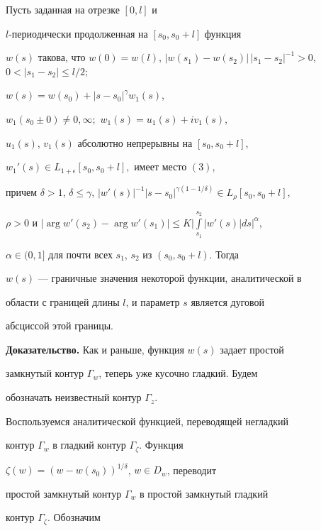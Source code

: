 \begin{thmnonum}


Пусть заданная на отрезке $[0,l]$ и


$l$-периодически продолженная на $[s_0,s_0 + l]$ функция


$w(s)$ такова, что $w(0) = w(l)$, $|w(s_1)-


w(s_2)|\,|s_1 - s_2|^{-1} > 0$, $0 < |s_1 - s_2| \leq l/2;$


$w(s) = w(s_0) + |s-s_0|^{\gamma}w_1(s)$,


$w_1(s_0 \pm 0) \ne 0,\infty;$ $w_1(s) = u_1(s) + iv_1(s)$,


$u_1(s)$, $v_1(s)$ абсолютно непрерывны на $[s_0 , s_0 + l]$,


$w_1'(s) \in L_{1+\epsilon}[s_0,s_0+l],$ имеет место $(3)$,


причем $\delta >1$, $\delta \leq \gamma$, $|w'(s)|^{-1}


|s-s_0|^{\gamma (1- 1/\delta)}\in L_{\rho}[s_0,s_0 + l]$,


$\rho > 0$ и $|\arg w'(s_2) -


\arg w'(s_1)|\leq K\Big|\int\limits_{s_1}^{s_2} |w'(s)|ds\Big|^{\alpha}$,


$\alpha\in (0,1]$ для почти всех $s_1$, $s_2$ из $(s_0, s_0 + l)$. Тогда


$w(s)$ --- граничные значения некоторой функции, аналитической в


области с границей длины $l$, и параметр $s$ является дуговой


абсциссой этой границы.


\end{thmnonum}





{\bf Доказательство.} Как и раньше, функция $w(s)$ задает простой


замкнутый контур $\Gamma_w$, теперь уже кусочно гладкий. Будем


обозначать неизвестный контур $\Gamma_z$.


Воспользуемся аналитической функцией, переводящей негладкий


контур $\Gamma_w$ в гладкий контур $\Gamma_{\zeta}$. Функция


$\zeta (w) = (w - w(s_0))^{1/{\delta}}$, $w\in D_w$, переводит


простой замкнутый контур $\Gamma_w$ в простой замкнутый гладкий


контур $\Gamma_{\zeta}$. Обозначим


